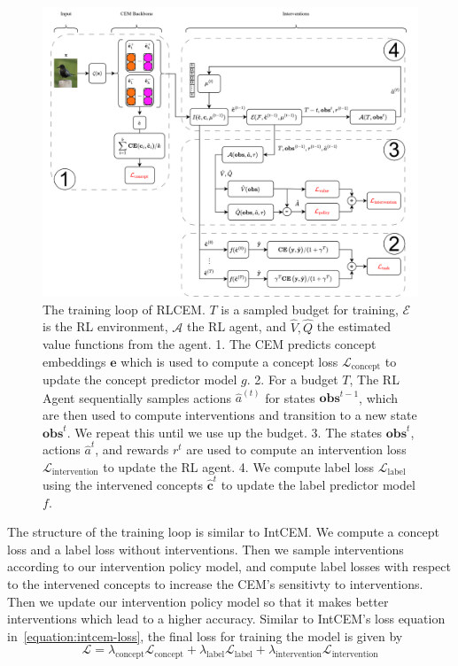 \begin{figure}
    \centering
    \includegraphics*[width=\textwidth]{figs/method/rlcem.png}
    \caption{The training loop of RLCEM. $T$ is a sampled budget for training, $\mathcal{E}$ is the RL environment, $\mathcal{A}$ the RL agent, 
    and $\hat{V}, \hat{Q}$ the estimated value functions from the agent. 1. The CEM predicts concept embeddings $\mathbf{e}$
    which is used to compute a  concept loss $\mathcal{L}_{\text{concept}}$ to update the concept predictor model $g$.
    2. For a budget $T$, The RL Agent sequentially samples actions $\hat{a}^(t)$ for states $\textbf{obs}^{t-1}$, which are then used to compute interventions and transition to a new state $\textbf{obs}^{t}$. We repeat this until we use up the budget.
    3. The states $\textbf{obs}^{t}$, actions $\hat{a}^{t}$, and rewards $r^{t}$ are used to compute an intervention loss $\mathcal{L}_{\text{intervention}}$ to update the RL agent. 4. We compute label loss $\mathcal{L}_{\text{label}}$ using the intervened concepts $\hat{\mathbf{c}}^t$ to update the label predictor model $f$.
    }
    \label{fig:rlcem}
\end{figure}

The structure of the training loop is similar to IntCEM.
 We compute a concept loss
and a label loss without interventions.
Then we sample interventions according to our intervention policy model,
and compute label losses with respect to the intervened concepts to increase 
the CEM's sensitivty to interventions. Then we update our intervention policy
model so that it makes better interventions which lead to a higher accuracy.
Similar to IntCEM's loss equation in~\ref{equation:intcem-loss}, the final loss for training the model is given by 
\[\mathcal{L} = \lambda_{\text{concept}} \mathcal{L}_{\text{concept}}
+  \lambda_{\text{label}} \mathcal{L}_{\text{label}}
+  \lambda_{\text{intervention}} \mathcal{L}_{\text{intervention}}\]

